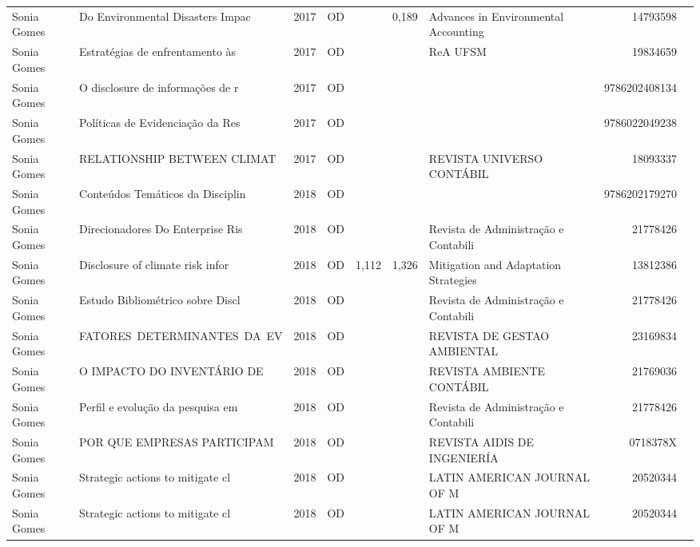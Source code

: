 \documentclass[12pt,brazil]{article}\usepackage[]{graphicx}\usepackage[]{xcolor}
\begin{document}
\begin{longtable}{lllrrllrr}
Sonia Gomes & Do Environmental Disasters Impac & 2017 & OD &  & 0,189 & Advances in Environmental Accounting & 14793598 \\
Sonia Gomes & Estratégias de enfrentamento às  & 2017 & OD &  &  & ReA UFSM & 19834659 \\
Sonia Gomes & O disclosure de informações de r & 2017 & OD &  &  &  & 9786202408134 \\
\rowcolor{ninval}\rowcolor{ninval}\rowcolor{ninval}\rowcolor{ninval}\rowcolor{ninval}\rowcolor{ninval}\rowcolor{ninval}\rowcolor{ninval}\rowcolor{ninval}\rowcolor{ninval}\rowcolor{ninval}\rowcolor{ninval}\rowcolor{ninval}\rowcolor{ninval}\rowcolor{ninval}\rowcolor{ninval}Sonia Gomes & Políticas de Evidenciação da Res & 2017 & OD &  &  &  & 9786022049238 \\
Sonia Gomes & RELATIONSHIP BETWEEN CLIMAT & 2017 & OD &  &  & REVISTA UNIVERSO CONTÁBIL & 18093337 \\
Sonia Gomes & Conteúdos Temáticos da Disciplin & 2018 & OD &  &  &  & 9786202179270 \\
Sonia Gomes & Direcionadores Do Enterprise Ris & 2018 & OD &  &  & Revista de Administração e Contabili & 21778426 \\
Sonia Gomes & Disclosure of climate risk infor & 2018 & OD & 1,112 & 1,326 & Mitigation and Adaptation Strategies & 13812386 \\
Sonia Gomes & Estudo Bibliométrico sobre Discl & 2018 & OD &  &  & Revista de Administração e Contabili & 21778426 \\
Sonia Gomes & FATORES DETERMINANTES DA EV & 2018 & OD &  &  & REVISTA DE GESTAO AMBIENTAL & 23169834 \\
Sonia Gomes & O IMPACTO DO INVENTÁRIO DE  & 2018 & OD &  &  & REVISTA AMBIENTE CONTÁBIL & 21769036 \\
Sonia Gomes & Perfil e evolução da pesquisa em & 2018 & OD &  &  & Revista de Administração e Contabili & 21778426 \\
Sonia Gomes & POR QUE EMPRESAS PARTICIPAM & 2018 & OD &  &  & REVISTA AIDIS DE INGENIERÍA & 0718378X \\
\rowcolor{coautr}\rowcolor{coautr}\rowcolor{coautr}\rowcolor{coautr}\rowcolor{coautr}\rowcolor{coautr}\rowcolor{coautr}\rowcolor{coautr}\rowcolor{coautr}\rowcolor{coautr}\rowcolor{coautr}\rowcolor{coautr}\rowcolor{coautr}\rowcolor{coautr}\rowcolor{coautr}\rowcolor{coautr}Sonia Gomes & Strategic actions to mitigate cl & 2018 & OD &  &  & LATIN AMERICAN JOURNAL OF M & 20520344 \\
\rowcolor{duplic}\rowcolor{duplic}\rowcolor{duplic}\rowcolor{duplic}\rowcolor{duplic}\rowcolor{duplic}\rowcolor{duplic}\rowcolor{duplic}\rowcolor{duplic}\rowcolor{duplic}\rowcolor{duplic}\rowcolor{duplic}\rowcolor{duplic}\rowcolor{duplic}\rowcolor{duplic}\rowcolor{duplic}Sonia Gomes & Strategic actions to mitigate cl & 2018 & OD &  &  & LATIN AMERICAN JOURNAL OF M & 20520344 \\

\end{longtable}
\end{document}
